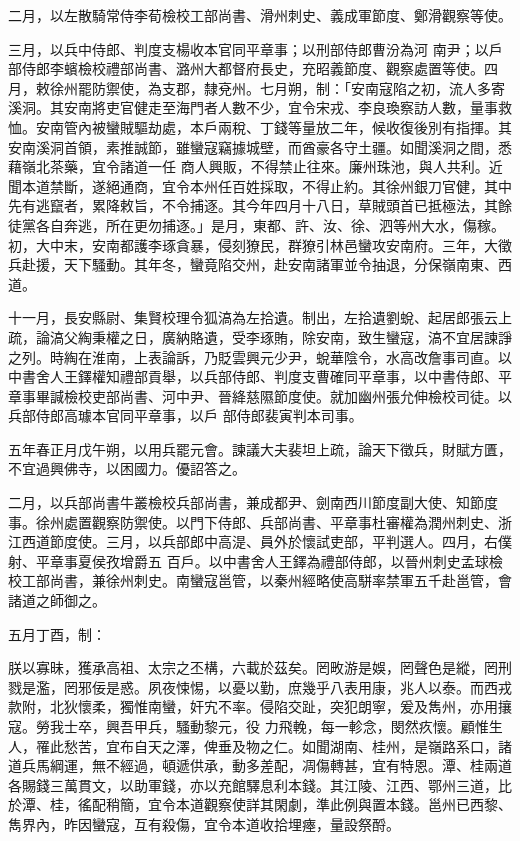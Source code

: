 \begin{pinyinscope}
 二月，以左散騎常侍李荀檢校工部尚書、滑州刺史、義成軍節度、鄭滑觀察等使。



 三月，以兵中侍郎、判度支楊收本官同平章事；以刑部侍郎曹汾為河
 南尹；以戶部侍郎李蠙檢校禮部尚書、潞州大都督府長史，充昭義節度、觀察處置等使。四月，敕徐州罷防禦使，為支郡，隸兗州。七月朔，制：「安南寇陷之初，流人多寄溪洞。其安南將吏官健走至海門者人數不少，宜令宋戎、李良瑍察訪人數，量事救恤。安南管內被蠻賊驅劫處，本戶兩稅、丁錢等量放二年，候收復後別有指揮。其安南溪洞首領，素推誠節，雖蠻寇竊據城壁，而酋豪各守土疆。如聞溪洞之間，悉藉嶺北茶藥，宜令諸道一任
 商人興販，不得禁止往來。廉州珠池，與人共利。近聞本道禁斷，遂絕通商，宜令本州任百姓採取，不得止約。其徐州銀刀官健，其中先有逃竄者，累降敕旨，不令捕逐。其今年四月十八日，草賊頭首已抵極法，其餘徒黨各自奔逃，所在更勿捕逐。」是月，東都、許、汝、徐、泗等州大水，傷稼。初，大中末，安南都護李琢貪暴，侵刻獠民，群獠引林邑蠻攻安南府。三年，大徵兵赴援，天下騷動。其年冬，蠻竟陷交州，赴安南諸軍並令抽退，分保嶺南東、西道。



 十一月，長安縣尉、集賢校理令狐滈為左拾遺。制出，左拾遺劉蛻、起居郎張云上疏，論滈父綯秉權之日，廣納賂遺，受李琢賄，除安南，致生蠻寇，滈不宜居諫諍之列。時綯在淮南，上表論訴，乃貶雲興元少尹，蛻華陰令，水高改詹事司直。以中書舍人王鐸權知禮部貢舉，以兵部侍郎、判度支曹確同平章事，以中書侍郎、平章事畢諴檢校吏部尚書、河中尹、晉絳慈隰節度使。就加幽州張允伸檢校司徒。以兵部侍郎高璩本官同平章事，以戶
 部侍郎裴寅判本司事。



 五年春正月戊午朔，以用兵罷元會。諫議大夫裴坦上疏，論天下徵兵，財賦方匱，不宜過興佛寺，以困國力。優詔答之。



 二月，以兵部尚書牛叢檢校兵部尚書，兼成都尹、劍南西川節度副大使、知節度事。徐州處置觀察防禦使。以門下侍郎、兵部尚書、平章事杜審權為潤州刺史、浙江西道節度使。三月，以兵部郎中高湜、員外於懷試吏部，平判選人。四月，右僕射、平章事夏侯孜增爵五
 百戶。以中書舍人王鐸為禮部侍郎，以晉州刺史孟球檢校工部尚書，兼徐州刺史。南蠻寇邕管，以秦州經略使高駢率禁軍五千赴邕管，會諸道之師御之。



 五月丁酉，制：



 朕以寡昧，獲承高祖、太宗之丕構，六載於茲矣。罔畋游是娛，罔聲色是縱，罔刑戮是濫，罔邪佞是惑。夙夜悚惕，以憂以勤，庶幾乎八表用康，兆人以泰。而西戎款附，北狄懷柔，獨惟南蠻，奸宄不率。侵陷交趾，突犯朗寧，爰及雋州，亦用攘寇。勞我士卒，興吾甲兵，騷動黎元，役
 力飛輓，每一軫念，閔然疚懷。顧惟生人，罹此愁苦，宜布自天之澤，俾垂及物之仁。如聞湖南、桂州，是嶺路系口，諸道兵馬綱運，無不經過，頓遞供承，動多差配，凋傷轉甚，宜有特恩。潭、桂兩道各賜錢三萬貫文，以助軍錢，亦以充館驛息利本錢。其江陵、江西、鄂州三道，比於潭、桂，徭配稍簡，宜令本道觀察使詳其閑劇，準此例與置本錢。邕州已西黎、雋界內，昨因蠻寇，互有殺傷，宜令本道收拾埋瘞，量設祭酹。




\end{pinyinscope}
